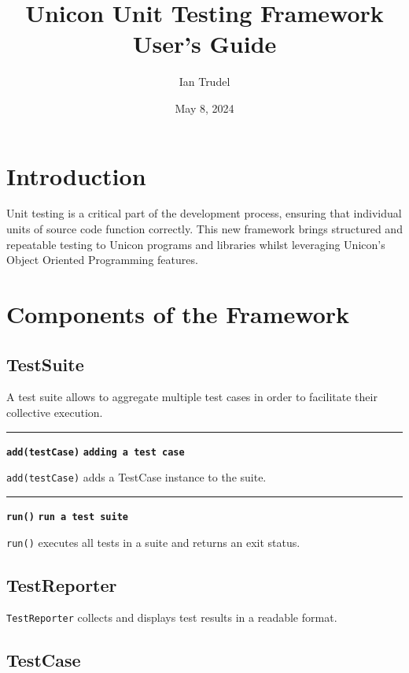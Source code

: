 \documentclass[letterpaper,12pt]{article}
\title{Unicon Unit Testing Framework\\ User's Guide}
\author{Ian Trudel}
\date{May 8, 2024}
\begin{document}
\maketitle

\section{Introduction}
Unit testing is a critical part of the development process, ensuring that individual units of source code function correctly. This new framework brings structured and repeatable testing to Unicon programs and libraries whilst leveraging Unicon's Object Oriented Programming features.

\section{Components of the Framework}
\subsection{TestSuite}
A test suite allows to aggregate multiple test cases in order to facilitate their collective execution.

\bigskip
\hrule\vspace{0.1cm}
\noindent
{\tt\bf add(testCase)} \hfill {\tt\bf adding a test case}

\vspace{0.1cm}
\noindent
\texttt{add(testCase)} adds a TestCase instance to the suite.

\bigskip
\hrule\vspace{0.1cm}
\noindent
{\tt\bf run()} \hfill {\tt\bf run a test suite}

\vspace{0.1cm}
\noindent
\texttt{run()} executes all tests in a suite and returns an exit status.


\subsection{TestReporter}

\texttt{TestReporter} collects and displays test results in a readable format.

\subsection{TestCase}
\end{document}
